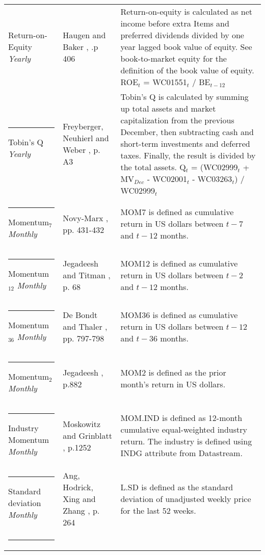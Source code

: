 \documentclass[12pt]{article}
\begin{document}
\begin{appendices}
{{\begin{xltabular}{\textwidth}{ >{\raggedright\arraybackslash}p{0.23\textwidth} >{\raggedright\arraybackslash}p{0.2\textwidth} X}
Return-on-Equity \newline \emph{Yearly}		& Haugen and Baker \citeyearpar{HAUGEN1996}, .p 406		& Return-on-equity is calculated as net income before extra Items and preferred dividends divided by one year lagged book value of equity. See book-to-market equity for the definition of the book value of equity. \newline ROE$_t$ = WC01551$_{t}$ / BE$_{t-12}$ \\ \rule{-1ex}{3ex}
Tobin's Q 	\newline \emph{Yearly}			& Freyberger, Neuhierl and Weber \citeyearpar{Freyberger2020}, p. A3 & Tobin's Q is calculated by summing up total assets and market capitalization from the previous December, then subtracting cash and short-term investments and deferred taxes. Finally, the result is divided by the total assets. \newline Q$_t$ = (WC02999$_{t}$ + MV$_{Dec}$ - WC02001$_{t}$ - WC03263$_{t}$) / WC02999$_{t}$ \\ \rule{-1ex}{3ex}
Momentum$_{7}$ \newline \emph{Monthly}	& Novy-Marx \citeyearpar{NOVYMARX2012}, pp. 431-432	& MOM7 is defined as cumulative return in US dollars between $t-7$ and $t-12$ months.\\ \rule{-1ex}{3ex}
Momentum$_{12}$ \newline \emph{Monthly}	& Jegadeesh and Titman \citeyearpar{Jegadeesh1993}, p. 68	& MOM12 is defined as cumulative return in US dollars between $t-2$ and $t-12$ months.\\ \rule{-1ex}{3ex}
Momentum$_{36}$ \newline \emph{Monthly}	& De Bondt and Thaler \citeyearpar{DeBondt1985}, pp. 797-798& MOM36 is defined as cumulative return in US dollars between $t-12$ and $t-36$ months.\\ \rule{-1ex}{3ex}
Momentum$_{2}$ \newline \emph{Monthly}	& Jegadeesh \citeyearpar{Jegadeesh1990}, p.882			& MOM2 is defined as the prior month's return in US dollars.\\ \rule{-1ex}{3ex}
Industry Momentum \newline \emph{Monthly} 	& Moskowitz and Grinblatt \citeyearpar{Moskowitz1999}, p.1252& MOM.IND is defined as 12-month cumulative equal-weighted industry return. The industry is defined using INDG attribute from Datastream. \\ \rule{-1ex}{3ex}
Standard deviation \newline \emph{Monthly}	& Ang, Hodrick, Xing and Zhang \citeyearpar{Ang2006}, p. 264	& L.SD is defined as the standard deviation of unadjusted weekly price for the last 52 weeks.\footnotemark {} \\ \rule{-1ex}{3ex}

\end{xltabular}}}
\end{appendices}
\end{document}
